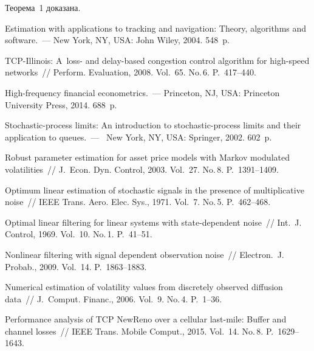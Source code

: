 \begin{multicols}{2}
{ Теорема~1 доказана.
 
 }


{\small\frenchspacing
 {%
 \begin{thebibliography}{99}

Estimation with applications to tracking and navigation: 
Theory, algorithms and software.~---
New York, NY, USA: John Wiley, 2004. 548~p.

{TCP}-{I}llinois: A~loss- and delay-based congestion control algorithm
  for high-speed networks~//
Perform. Evaluation, 2008. Vol.~65. No.\,6. P.~417--440.

High-frequency financial econometrics.~--- Princeton, NJ, USA:
Princeton University Press, 2014. 688~p.

 Stochastic-process limits: An introduction to
  stochastic-process limits and their application to queues.~---~
 New York, NY, USA: Springer, 2002. 602~p.

Robust parameter estimation for asset price models with Markov
  modulated volatilities~// J.~Econ. Dyn. Control, 2003. Vol.~27. No.\,8. P.~1391--1409.

 

Optimum linear estimation of stochastic signals in the presence of
  multiplicative noise~//
IEEE Trans. Aero. Elec. Sys., 1971. Vol.~7. No.\,5.
  P.~462--468.

   Optimal linear filtering for linear systems with
   state-dependent noise~// Int.~J. Control, 1969. Vol.~10. No.\,1. P.~41--51.

  Nonlinear filtering with signal dependent observation
noise~// Electron.~J. Probab., 2009. Vol.~14. P.~1863--1883.

Numerical estimation of volatility values from discretely observed
  diffusion data~//
J.~Comput. Financ., 2006.  Vol.~9. No.\,4. P.~1--36.

Performance analysis of TCP NewReno over a cellular last-mile:
  Buffer and channel losses~//
IEEE Trans. Mobile Comput., 2015. Vol.~14. No.\,8. P.~1629--1643.


\end{thebibliography}}}
\end{multicols}
